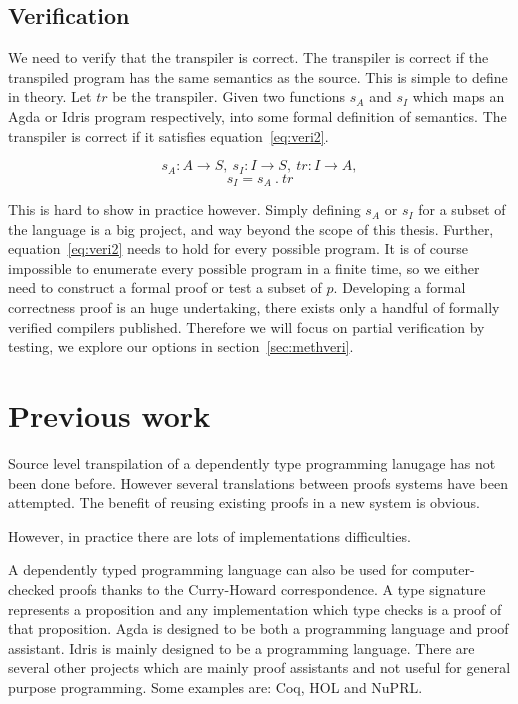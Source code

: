 \subsection{Verification}\label{sec:veri}

We need to verify that the transpiler is correct. The transpiler is correct if
the transpiled program has the same semantics as the source.
This is simple to define in theory.
Let $tr$ be the transpiler.
Given two functions $s_A$ and $s_I$ which maps an Agda or Idris program
respectively, into some formal definition of semantics.
The transpiler is correct if it satisfies equation~\ref{eq:veri2}.

\begin{equation} \label{eq:veri1}
  s_A : A \rightarrow S,
  \ s_I : I \rightarrow S,
  \ tr : I \rightarrow A,
\end{equation}
\begin{equation} \label{eq:veri2}
  s_I = s_A\ .\ tr
\end{equation}

This is hard to show in practice however. Simply defining $s_A$ or $s_I$ for
a subset of the language is a big project, and way beyond the scope of this
thesis.
Further, equation~\ref{eq:veri2} needs to hold for every possible program.
It is of course impossible to enumerate every possible program in a finite
time, so we either need to construct a formal proof or test a subset of $p$.
Developing a formal correctness proof is an huge undertaking, there
exists only a handful of formally verified compilers published. Therefore we
will focus on partial verification by testing, we explore our options in
section~\ref{sec:methveri}.



\section{Previous work}

Source level transpilation of a dependently type programming lanugage has not
been done before. However several translations between proofs systems have been
attempted. The benefit of reusing existing proofs in a new system is obvious.

However, in practice there are lots of implementations difficulties.

A dependently typed programming language can also be used for computer-checked
proofs thanks to the Curry-Howard correspondence. A type signature represents
a proposition and any implementation which type checks is a proof of that
proposition. Agda is designed to be both a programming language and proof
assistant. Idris is mainly designed to be a programming language. There are
several other projects which are mainly proof assistants and not useful for
general purpose programming. Some examples are: Coq, HOL and NuPRL.

